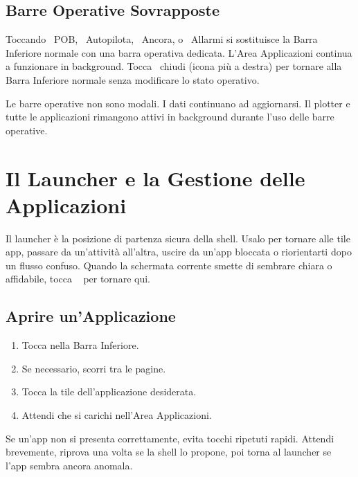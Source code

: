 \section{Barre Operative Sovrapposte}

Toccando ~POB, ~Autopilota,
~Ancora, o ~Allarmi si sostituisce la Barra
Inferiore normale con una barra operativa dedicata.
L'Area Applicazioni continua a funzionare in background.
Tocca ~chiudi (icona più a destra) per tornare alla Barra Inferiore
normale senza modificare lo stato operativo.

\begin{warningbox}
Le barre operative non sono modali.
I dati continuano ad aggiornarsi.
Il plotter e tutte le applicazioni rimangono attivi in background durante l'uso delle barre operative.
\end{warningbox}

\chapter{Il Launcher e la Gestione delle Applicazioni}
\label{ch:launcher}

Il launcher è la posizione di partenza sicura della shell.
Usalo per tornare alle tile app, passare da un'attività all'altra, uscire da un'app bloccata
o riorientarti dopo un flusso confuso.
Quando la schermata corrente smette di sembrare chiara o affidabile, tocca
~ per tornare qui.


\section{Aprire un'Applicazione}

\begin{enumerate}
  \item Tocca  nella Barra Inferiore.
  \item Se necessario, scorri tra le pagine.
  \item Tocca la tile dell'applicazione desiderata.
  \item Attendi che si carichi nell'Area Applicazioni.
\end{enumerate}

Se un'app non si presenta correttamente, evita tocchi ripetuti rapidi.
Attendi brevemente, riprova una volta se la shell lo propone, poi torna al launcher
se l'app sembra ancora anomala.

